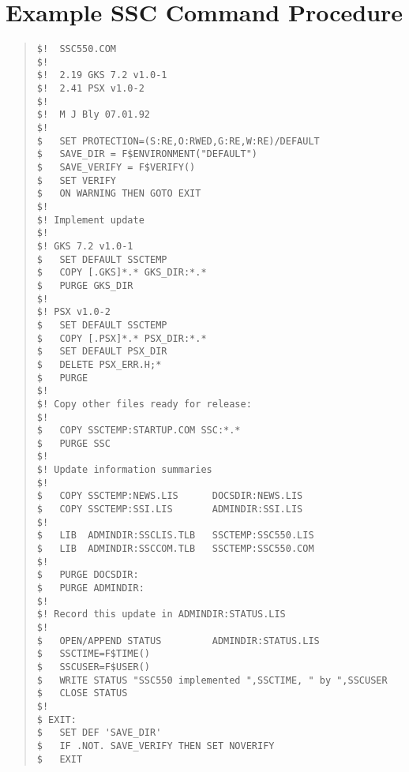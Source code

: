 \newpage
\section {Example SSC Command Procedure}
\label{se:ex.proc}
\begin{quote}
\begin{verbatim}
$!	SSC550.COM
$!
$!	2.19 GKS 7.2 v1.0-1
$!	2.41 PSX v1.0-2
$!
$!	M J Bly 07.01.92
$!
$	SET PROTECTION=(S:RE,O:RWED,G:RE,W:RE)/DEFAULT
$	SAVE_DIR = F$ENVIRONMENT("DEFAULT")
$	SAVE_VERIFY = F$VERIFY()
$	SET VERIFY
$	ON WARNING THEN GOTO EXIT
$!
$! Implement update
$!
$! GKS 7.2 v1.0-1
$	SET DEFAULT SSCTEMP
$	COPY [.GKS]*.* GKS_DIR:*.*
$	PURGE GKS_DIR
$!
$! PSX v1.0-2
$	SET DEFAULT SSCTEMP
$	COPY [.PSX]*.* PSX_DIR:*.*
$	SET DEFAULT PSX_DIR
$	DELETE PSX_ERR.H;*
$	PURGE
$!
$! Copy other files ready for release:
$!
$	COPY SSCTEMP:STARTUP.COM SSC:*.*
$	PURGE SSC
$!
$! Update information summaries
$!
$	COPY SSCTEMP:NEWS.LIS      DOCSDIR:NEWS.LIS
$	COPY SSCTEMP:SSI.LIS       ADMINDIR:SSI.LIS
$!
$	LIB  ADMINDIR:SSCLIS.TLB   SSCTEMP:SSC550.LIS
$	LIB  ADMINDIR:SSCCOM.TLB   SSCTEMP:SSC550.COM
$!
$	PURGE DOCSDIR:
$	PURGE ADMINDIR:
$!
$! Record this update in ADMINDIR:STATUS.LIS
$!
$	OPEN/APPEND STATUS         ADMINDIR:STATUS.LIS
$	SSCTIME=F$TIME()
$	SSCUSER=F$USER()
$	WRITE STATUS "SSC550 implemented ",SSCTIME, " by ",SSCUSER
$	CLOSE STATUS
$!
$ EXIT:
$	SET DEF 'SAVE_DIR'
$	IF .NOT. SAVE_VERIFY THEN SET NOVERIFY
$	EXIT
\end{verbatim}
\end{quote}

\newpage
